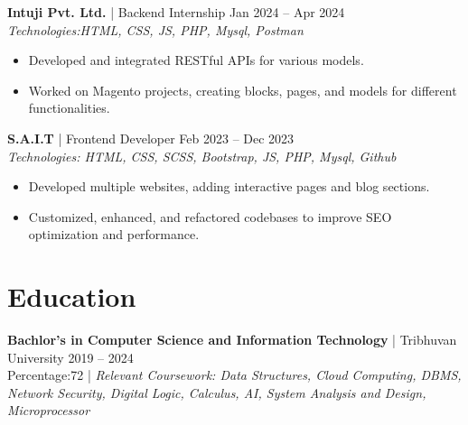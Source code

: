 \documentclass[a4paper,10pt]{article}
\begin{document}
\noindent\textbf{Intuji Pvt. Ltd.} | Backend Internship \hfill Jan 2024 -- Apr 2024 \\
\textit{Technologies:HTML, CSS, JS, PHP, Mysql, Postman }

\begin{itemize}
    \item Developed and integrated RESTful APIs for various models. 
    \item Worked on Magento projects, creating blocks, pages, and models for different functionalities.



\end{itemize}

\noindent\textbf{S.A.I.T} | Frontend Developer \hfill Feb 2023 -- Dec 2023 \\
\textit{Technologies: HTML, CSS, SCSS, Bootstrap, JS, PHP, Mysql, Github}

\begin{itemize}
    \item Developed multiple websites, adding interactive pages and blog sections.
    \item  Customized, enhanced, and refactored codebases to improve SEO optimization and performance.

\end{itemize}



\section*{Education}
\textbf{Bachlor's in Computer Science and Information Technology} | Tribhuvan University \hfill 2019 -- 2024 \\
Percentage:72 | \textit{Relevant Coursework: Data Structures, Cloud Computing, DBMS, Network Security, Digital Logic, Calculus, AI, System Analysis and Design, Microprocessor}
\end{document}

